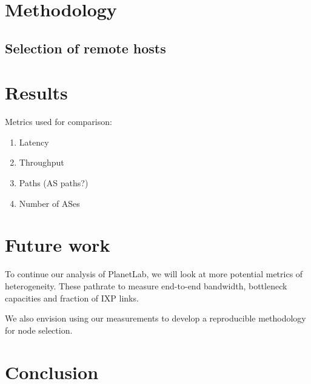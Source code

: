 \documentclass{sig-alternate-10pt}
\begin{document}
\section{Methodology}

\subsection{Selection of remote hosts}

\section{Results}

Metrics used for comparison:

\begin{enumerate}
\item Latency
\item Throughput
\item Paths (AS paths?)
\item Number of ASes
\end{enumerate}

\section{Future work}

To continue our analysis of PlanetLab, we will look at more potential metrics of 
heterogeneity. These pathrate to measure end-to-end bandwidth, bottleneck capacities 
and fraction of IXP links.

We also envision using our measurements to develop a reproducible methodology for 
node selection. 

\section{Conclusion}




\end{document}
